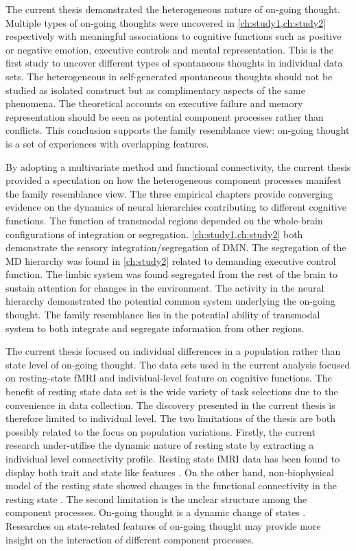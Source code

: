The current thesis demonstrated the heterogeneous nature of on-going thought. Multiple types of on-going thoughts were uncovered in \cref{ch:study1,ch:study2} respectively with meaningful associations to cognitive functions such as positive or negative emotion, executive controls and mental representation. This is the first study to uncover different types of spontaneous thoughts in individual data sets. The heterogeneous in self-generated spontaneous thoughts should not be studied as isolated construct but as complimentary aspects of the same phenomena. The theoretical accounts on executive failure and memory representation should be seen as potential component processes rather than conflicts. This conclusion supports the family resemblance view: on-going thought is a set of experiences with overlapping features. 

By adopting a multivariate method and functional connectivity, the current thesis provided a speculation on how the heterogeneous component processes manifest the family resemblance view. The three empirical chapters provide converging evidence on the dynamics of neural hierarchies contributing to different cognitive functions. The function of transmodal regions depended on the whole-brain configurations of integration or segregation. \cref{ch:study1,ch:study2} both demonstrate the sensory integration/segregation of DMN. The segregation of the MD hierarchy was found in \cref{ch:study2} related to demanding executive control function. The limbic system was found segregated from the rest of the brain to sustain attention for changes in the environment. The activity in the neural hierarchy demonstrated the potential common system underlying the on-going thought. The family resemblance lies in the potential ability of transmodal system to both integrate and segregate information from other regions. 

The current thesis focused on individual differences in a population rather than state level of on-going thought. The data sets used in the current analysis focused on resting-state fMRI and individual-level feature on cognitive functions. The benefit of resting state data set is the wide variety of task selections due to the convenience in data collection. The discovery presented in the current thesis is therefore limited to individual level. The two limitations of the thesis are both possibly related to the focus on population variations. Firstly, the current research under-utilise the dynamic nature of resting state by extracting a individual level connectivity profile. Resting state fMRI data has been found to display both trait and state like features \cite{Geerligs2015}. On the other hand, non-biophysical model of the resting state showed changes in the functional connectivity in the resting state \cite{Vidaurre2017}. The second limitation is the unclear structure among the component processes. On-going thought is a dynamic change of states \cite{KucyiNI2017}. Researches on state-related features of on-going thought may provide more insight on the interaction of different component processes.


